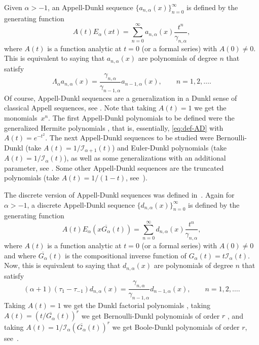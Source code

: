 \documentclass[11pt]{article}
\theoremstyle{plain}
\theoremstyle{remark}
\numberwithin{equation}{section} %
\newcommand{\Ea}{E_{\alpha}}
\newcommand{\La}{\Lambda_{\alpha}}
\newcommand{\I}{\mathcal{I}}
\begin{document}
Given $\alpha>-1$, an Appell-Dunkl sequence $\{a_{n,\alpha}(x)\}_{n=0}^\infty$ is defined by the generating function
\begin{equation}
\label{eq:def-AD}
A(t)\Ea(xt) = \sum_{n=0}^\infty a_{n,\alpha}(x) \frac{t^n}{\gamma_{n,\alpha}},
\end{equation}
where $A(t)$ is a function analytic at $t = 0$ (or a formal series) with $A(0) \ne 0$. This is equivalent to saying that $a_{n,\alpha}(x)$ are polynomials of degree $n$ that satisfy
\begin{equation}\label{eq:der-AD}
  \La a_{n,\alpha}(x) = \frac{\gamma_{n,\alpha}}{\gamma_{n-1,\alpha}}a_{n-1,\alpha}(x), \qquad n = 1,2,\dots.
\end{equation}
Of course, Appell-Dunkl sequences are a generalization in a Dunkl sense of classical Appell sequences, see \cite{BG, CDPV, DH}. Note that taking $A(t) = 1$ we get the monomials~$x^n$. The first Appell-Dunkl polynomials to be defined were the generalized Hermite polynomials \cite{Ros}, that is, essentially, \eqref{eq:def-AD} with $A(t) = e^{-t^2}$. The next Appell-Dunkl sequences to be studied were Bernoulli-Dunkl (take $A(t) = 1/\I_{\alpha+1}(t)$) and Euler-Dunkl polynomials (take $A(t) = 1/\I_{\alpha}(t)$), as well as some generalizations with an additional parameter, see \cite{CDPV, CMV, DPV}. Some other Appell-Dunkl sequences are the truncated polynomials (take $A(t) = 1/(1-t)$, see~\cite{JMC}).



The discrete version of Appell-Dunkl sequences was defined in~\cite{ELMV}. Again for $\alpha>-1$, a discrete Appell-Dunkl sequence $\{d_{n,\alpha}(x)\}_{n=0}^\infty$ is defined by the generating function
\begin{equation*}
A(t)\Ea(x\overline{G_{\alpha}}(t)) = \sum_{n=0}^\infty d_{n,\alpha}(x) \frac{t^n}{\gamma_{n,\alpha}},
\end{equation*}
where $A(t)$ is a function analytic at $t = 0$ (or a formal series) with $A(0) \ne 0$ and where $\overline{G_{\alpha}}(t)$ is the compositional inverse function of $G_{\alpha}(t) = t\mathcal{I_\alpha}(t)$. Now, this is equivalent to saying that $d_{n,\alpha}(x)$ are polynomials of degree $n$ that satisfy
\[
(\alpha+1)(\tau_{1} - \tau_{-1})d_{n,\alpha}(x) 
= \frac{\gamma_{n,\alpha}}{\gamma_{n-1,\alpha}} d_{n-1,\alpha}(x),
\qquad n = 1,2,\dots.
\]
Taking $A(t) = 1$ we get the Dunkl factorial polynomials \cite{ELMV}, taking $A(t) = (t/\overline{G_{\alpha}}(t))^r$ we get Bernoulli-Dunkl polynomials of order $r$ \cite{ELMV}, and taking $A(t) = 1/\I_{\alpha}(\overline{G_{\alpha}}(t))^r$ we get Boole-Dunkl polynomials of order $r$, see~\cite{GLMV}.
\end{document}

